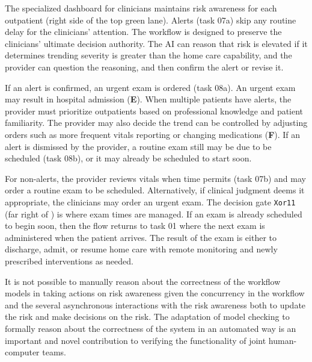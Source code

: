 The specialized dashboard for clinicians maintains risk awareness for each outpatient (right side of the top green lane). Alerts (task 07a) skip any routine delay for the clinicians' attention. The workflow is designed to preserve the clinicians' ultimate decision authority. The AI can reason that risk is elevated if it determines trending severity is greater than the home care capability, and the provider can question the reasoning, and then confirm the alert or revise it. 

If an alert is confirmed, an urgent exam is ordered (task 08a). An urgent exam may result in hospital admission (\textbf{E}). When multiple patients have alerts, the provider must prioritize outpatients based on professional knowledge and patient familiarity. The provider may also decide the trend can be controlled by adjusting orders such as more frequent vitals reporting or changing medications (\textbf{F}). If an alert is dismissed by the provider, a routine exam still may be due to be scheduled (task 08b), or it may already be scheduled to start soon. 

For non-alerts, the provider reviews vitals when time permits (task 07b) and may order a routine exam to be scheduled. Alternatively, if clinical judgment deems it appropriate, the clinicians may order an urgent exam. The decision gate \texttt{Xor11} (far right of ) is where exam times are managed. If an exam is already scheduled to begin soon, then the flow returns to task 01 where the next exam is administered when the patient arrives. The result of the exam is either to discharge, admit, or resume home care with remote monitoring and newly prescribed interventions as needed.

It is not possible to manually reason about the correctness of the workflow models in taking actions on risk awareness given the concurrency in the workflow and the several asynchronous interactions with the risk awareness both to update the risk and make decisions on the risk. The adaptation of model checking to formally reason about the correctness of the system in an automated way is an important and novel contribution to verifying the functionality of joint human-computer teams. 

\begin{comment}
The rest of this paper describes the verification of the workflow against the CWP as a verification requirement. The verification is accomplished with the SPIN model checker. 

The CWP in \figref{fig:cwp} is translated into equivalent Linear Temporal Logic (LTL), and the workflow in \figref{fig:bpmn} is translated into its equivalent Promela model, where Promela is the input language for SPIN. The SPIN model checker then verifies that the workflow in its current form does indeed implement the CWP.
\end{comment}